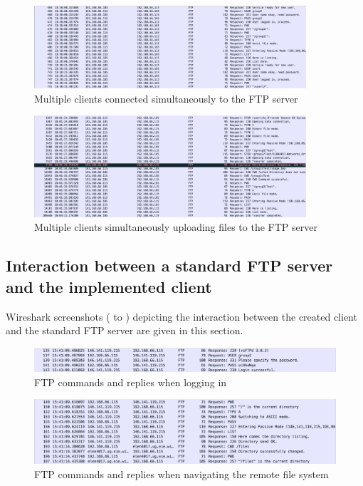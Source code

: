 \documentclass[10pt,twocolumn]{witseiepaper}
\begin{document}
\begin{appendix}
\begin{figure}[h]
	\centering
	\includegraphics[width=0.9\textwidth]{multipleConnections.png}
	\caption{Multiple clients connected simultaneously to the FTP server}
	\raggedright
	\label{fig:multiple}	
\end{figure}

\begin{figure}[h]
	\centering
	\includegraphics[width=0.9\textwidth]{multipleUpload.png}
	\caption{Multiple clients simultaneously uploading files to the FTP server}
	\raggedright
	\label{fig:multipleUpload}	
\end{figure}

\subsection{Interaction between a standard FTP server and the implemented client} \label{sec:ourClientWitsServer}

Wireshark screenshots ( to ) depicting the interaction between the created client and the standard FTP server are given in this section.

\begin{figure}[h]
	\centering
	\includegraphics[width=1\textwidth]{loginWits.png}
	\caption{FTP commands and replies when logging in}
	\raggedright
	\label{fig:loginWits}	
\end{figure}

\begin{figure}[h]
	\centering
	\includegraphics[width=1\textwidth]{navigateWits.png}
	\caption{FTP commands and replies when navigating the remote file system}
	\raggedright
	\label{fig:navigateWits}	
\end{figure}


\end{appendix}
\end{document}
